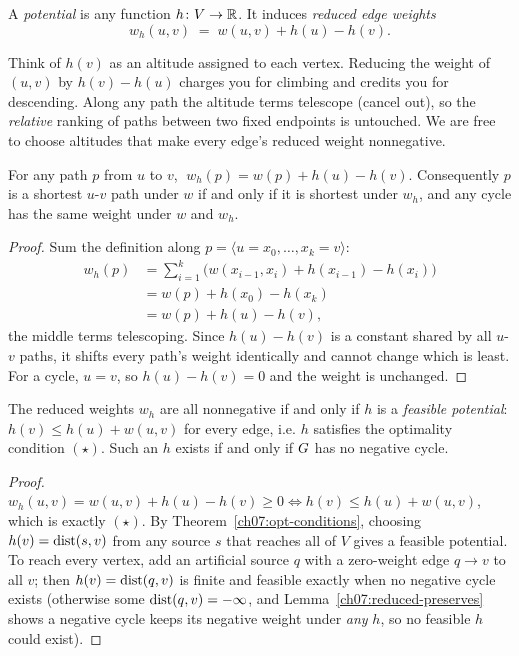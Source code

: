 \begin{definition}
\label{ch07:def-potential}
A \emph{potential} is any function $h\colon V\to\mathbb{R}$. It induces \emph{reduced edge weights}
\[
   w_h(u,v) \;=\; w(u,v) + h(u) - h(v).
\]
\end{definition}

\begin{intuitionbox}
Think of $h(v)$ as an altitude assigned to each vertex. Reducing the weight of $(u,v)$ by
$h(v)-h(u)$ charges you for climbing and credits you for descending. Along any path the
altitude terms telescope (cancel out), so the \emph{relative} ranking of paths between two
fixed endpoints is untouched. We are free to choose altitudes that make every edge's reduced
weight nonnegative.
\end{intuitionbox}

\begin{lemma}
\label{ch07:reduced-preserves}
For any path $p$ from $u$ to $v$, $\;w_h(p) = w(p) + h(u) - h(v)$. Consequently $p$ is a
shortest $u$-$v$ path under $w$ if and only if it is shortest under $w_h$, and any cycle has
the same weight under $w$ and $w_h$.
\end{lemma}

\begin{proof}
Sum the definition along $p=\langle u=x_0,\dots,x_k=v\rangle$:
\begin{align*}
   w_h(p) &= \sum_{i=1}^{k}\bigl(w(x_{i-1},x_i)+h(x_{i-1})-h(x_i)\bigr) \\
          &= w(p) + h(x_0)-h(x_k) \\
          &= w(p)+h(u)-h(v),
\end{align*}
the middle terms telescoping. Since $h(u)-h(v)$ is a constant shared by all $u$-$v$ paths,
it shifts every path's weight identically and cannot change which is least. For a cycle,
$u=v$, so $h(u)-h(v)=0$ and the weight is unchanged.
\end{proof}

\begin{theorem}
\label{ch07:feasible-potential}
The reduced weights $w_h$ are all nonnegative if and only if $h$ is a \emph{feasible
potential}: $h(v)\le h(u)+w(u,v)$ for every edge, i.e. $h$ satisfies the optimality
condition $(\star)$. Such an $h$ exists if and only if $G$ has no negative cycle.
\end{theorem}

\begin{proof}
$w_h(u,v)=w(u,v)+h(u)-h(v)\ge 0 \iff h(v)\le h(u)+w(u,v)$, which is exactly $(\star)$.
By Theorem~\ref{ch07:opt-conditions}, choosing $h(v)=\operatorname{dist}(s,v)$ from any source $s$ that
reaches all of $V$ gives a feasible potential. To reach every vertex, add an artificial
source $q$ with a zero-weight edge $q\to v$ to all $v$; then $h(v)=\operatorname{dist}(q,v)$ is finite and
feasible exactly when no negative cycle exists (otherwise some $\operatorname{dist}(q,v)=-\infty$, and
Lemma~\ref{ch07:reduced-preserves} shows a negative cycle keeps its negative weight under
\emph{any} $h$, so no feasible $h$ could exist).
\end{proof}


